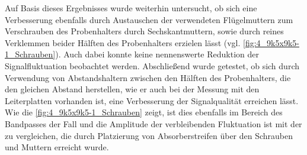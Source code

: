 Auf Basis dieses Ergebnisses wurde weiterhin untersucht, ob sich eine Verbesserung ebenfalls durch Austauschen der verwendeten Flügelmuttern zum Verschrauben des Probenhalters durch Sechskantmuttern, sowie durch reines Verklemmen beider Hälften des Probenhalters erzielen lässt (vgl. \Abb\ref{fig:4_9k5x9k5-1_Schrauben}). Auch dabei konnte keine nennenswerte Reduktion der Signalfluktuation beobachtet werden. Abschließend wurde getestet, ob sich durch Verwendung von Abstandshaltern zwischen den Hälften des Probenhalters, die den gleichen Abstand herstellen, wie er auch bei der Messung mit den Leiterplatten vorhanden ist, eine Verbesserung der Signalqualität erreichen lässt. Wie die \Abb\ref{fig:4_9k5x9k5-1_Schrauben} zeigt, ist dies ebenfalls im Bereich des Bandpasses der Fall und die Amplitude der verbleibenden Fluktuation ist mit der zu vergleichen, die durch Platzierung von Absorberstreifen über den Schrauben und Muttern erreicht wurde. 
\par
\vspace{\linespace}

